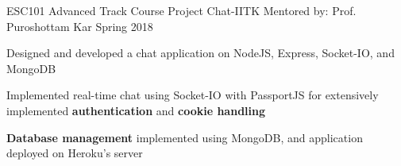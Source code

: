 
\begin{cventries}

  \cventry
    {ESC101 Advanced Track Course Project}
    {Chat-IITK}
    {Mentored by: Prof. Puroshottam Kar}
    {Spring 2018}
    {
      \begin{cvitems}
        \item {Designed and developed a chat application on NodeJS, Express, Socket-IO, and MongoDB}
        \item {Implemented real-time chat using Socket-IO with PassportJS for extensively implemented \textbf{authentication} and \textbf{cookie handling}}
        \item {\textbf{Database management} implemented using MongoDB, and application deployed on Heroku's server}
      \end{cvitems}
    }
    
\end{cventries}
